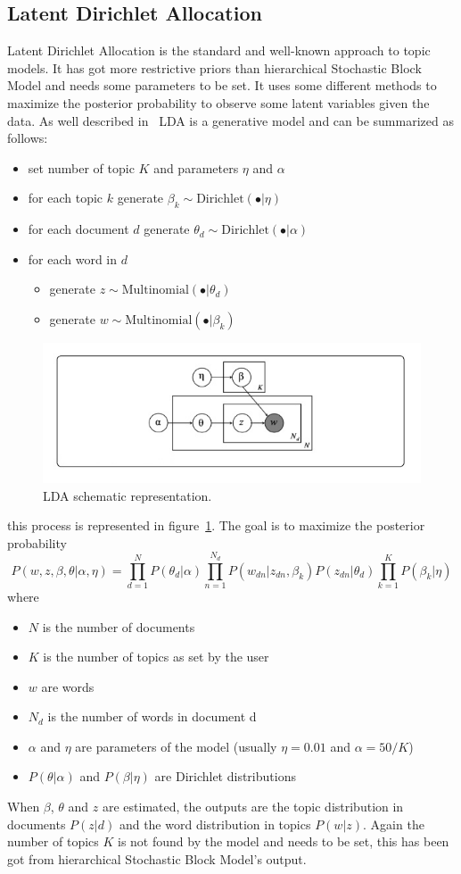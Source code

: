 \subsection{Latent Dirichlet Allocation}\label{sec:lda}
Latent Dirichlet Allocation is the standard and well-known approach to topic models. It has got more restrictive priors than hierarchical Stochastic Block Model and needs some parameters to be set. It uses some different methods to maximize the posterior probability to observe some latent variables given the data.
As well described in~\cite{Zhou2016} LDA is a generative model and can be summarized as follows:
\begin{itemize}
	\item set number of topic $K$ and parameters $\eta$ and $\alpha$
	\item for each topic $k$ generate $\beta_k\sim \text{Dirichlet}(\bullet |\eta)$
	\item for each document $d$ generate $\theta_d\sim \text{Dirichlet}(\bullet|\alpha)$
	\item for each word in $d$ 
	\begin{itemize}
		\item generate $z\sim \text{Multinomial}(\bullet|\theta_d)$
		\item generate $w\sim \text{Multinomial}(\bullet|\beta_k)$
	\end{itemize}
\end{itemize}
\begin{figure}[htb!]
	\centering
	\includegraphics[width=0.65\linewidth]{pictures/topic/LDA.jpeg}
	\caption{LDA schematic representation.}
	\label{fig:LDA}
\end{figure}
this process is represented in figure~\ref{fig:LDA}. The goal is to maximize the posterior probability
\begin{equation}\label{eq:lda}
P(w, z,\beta, \theta| \alpha, \eta)=\prod_{d=1}^N P(\theta_d | \alpha)\prod_{n=1}^{N_d} P(w_{dn}|z_{dn},\beta_k)P(z_{dn}|\theta_d)\prod_{k=1}^KP(\beta_k|\eta)
\end{equation}
where
\begin{itemize}
	\item $N$ is the number of documents
	\item $K$ is the number of topics as set by the user
	\item $w$ are words
	\item $N_d$ is the number of words in document d
	\item $\alpha$ and $\eta$ are parameters of the model (usually $\eta=0.01$ and $\alpha=50/K$)
	\item $P(\theta | \alpha)$ and $P(\beta|\eta)$ are Dirichlet distributions
\end{itemize}
When $\beta$, $\theta$ and $z$ are estimated, the outputs are the topic distribution in documents $P(z|d)$ and the word distribution in topics $P(w|z)$.
Again the number of topics $K$ is not found by the model and needs to be set, this has been got from hierarchical Stochastic Block Model's output.